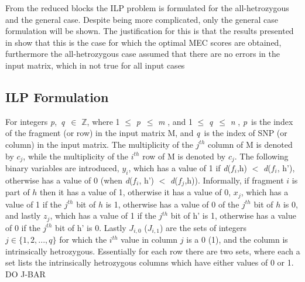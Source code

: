\documentclass[10pt,twocolumn]{witseiepaper}
\newcommand{\M}{\textit{m }}
\newcommand{\N}{\textit{n }}
\newcommand{\D}{\textit{d}}
\newcommand{\PP}{\textit{p}}
\newcommand{\QQ}{\textit{q}}
\begin{document}
From the reduced blocks the ILP problem is formulated for the all-hetrozygous and the general case. Despite
being more complicated, only the general case formulation will be shown. The justification for this is that  
the results presented in \cite{chen:2013} show that this is the case for which the optimal MEC scores are 
obtained, furthermore the all-hetrozygous case assumed that there are no errors in the input matrix, which
in not true for all input cases

\subsection{ ILP Formulation } \label{ssec:ilpform}

For integers \PP,\ \QQ\ $\in$ $\mathbb{Z}$, where 1 $\le$ \PP\ $\le$ \M, and 1 $\le$ \QQ\ $\le$ \N, \PP\ is the 
index of the fragment (or row) in the input matrix M, and \QQ\ is the index of SNP (or column) in the input 
matrix. The multiplicity of the $j^{th}$ column of M is denoted by $c_j$, while the multiplicity of the
$i^{th}$ row of M is denoted by $c_j$. The following binary variables are introduced, $y_i$, which has a value of 1
if \D($f_i$,h) $<$ \D($f_i$, h'), otherwise has a value of 0 (when \D($f_i$, h') $<$ \D($f_j$,h)). Informally,
if fragment $i$ is part of $h$ then it has a value of 1, otherwise it has a value of 0, $x_j$, which has a 
value of 1 if the $j^{th}$ bit of $h$ is 1, otherwise has a value of 0 of the $j^{th}$ bit of $h$ is 0, and
lastly $z_j$, which has a value of 1 if the $j^{th}$ bit of h' is 1, otherwise has a value of 0 if the
$j^{th}$ bit of h' is 0. Lastly $J_{i,0}$ ($J_{i,1}$) are the sets of integers $j \in \{1,2,...,q\}$ for which 
the $i^{th}$ value in column $j$ is a 0 (1), and the column is intrinsically hetrozygous. Essentially for each
row there are two sets, where each a set lists the intrinsically hetrozygous columns which have either values 
of 0 or 1. DO J-BAR 
\end{document}
